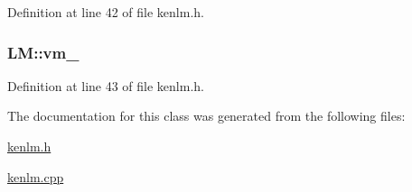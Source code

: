 Definition at line 42 of file kenlm.\+h.

\subsubsection[{\texorpdfstring{vm\+\_\+}{vm_}}]{ L\+M\+::vm\+\_\+\hspace{0.3cm}{\ttfamily [private]}}\hypertarget{classLM_ae4104db4aba39ca0723c3cd4a6298068}{}\label{classLM_ae4104db4aba39ca0723c3cd4a6298068}


Definition at line 43 of file kenlm.\+h.



The documentation for this class was generated from the following files\+:\begin{DoxyCompactItemize}
\item 
\hyperlink{kenlm_8h}{kenlm.\+h}\item 
\hyperlink{kenlm_8cpp}{kenlm.\+cpp}\end{DoxyCompactItemize}
